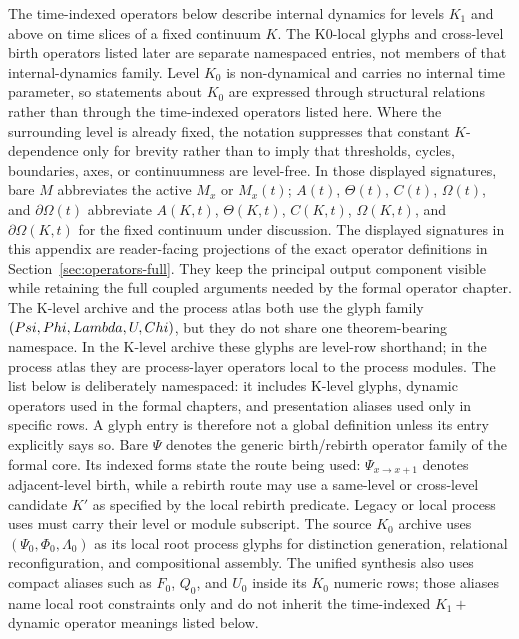 The time-indexed operators below describe internal dynamics for levels \(K_1\)
and above on time slices of a fixed continuum \(K\). The K0-local glyphs and
cross-level birth operators listed later are separate namespaced entries, not
members of that internal-dynamics family. Level \(K_0\) is non-dynamical and
carries no internal time parameter, so statements about \(K_0\) are expressed
through structural relations rather than through the time-indexed operators
listed here. Where the surrounding level is already fixed, the notation
suppresses that constant \(K\)-dependence only for brevity rather than to imply
that thresholds, cycles, boundaries, axes, or continuumness are level-free.
In those displayed signatures, bare \(M\) abbreviates the active \(M_x\) or
\(M_x(t)\); \(A(t)\), \(\Theta(t)\), \(C(t)\), \(\Omega(t)\), and
\(\partial\Omega(t)\) abbreviate \(A(K,t)\), \(\Theta(K,t)\), \(C(K,t)\),
\(\Omega(K,t)\), and \(\partial\Omega(K,t)\) for the fixed continuum under
discussion.
The displayed signatures in this appendix are reader-facing projections of
the exact operator definitions in Section~\ref{sec:operators-full}. They keep
the principal output component visible while retaining the full coupled
arguments needed by the formal operator chapter.
The K-level archive and the process atlas both use the glyph family
\((Psi,Phi,Lambda,U,Chi)\), but they do not share one theorem-bearing
namespace. In the K-level archive these glyphs are level-row shorthand; in the
process atlas they are process-layer operators local to the process modules.
The list below is deliberately namespaced: it includes K-level glyphs, dynamic
operators used in the formal chapters, and presentation aliases used only in
specific rows. A glyph entry is therefore not a global definition unless its
entry explicitly says so.
Bare \(\Psi\) denotes the generic birth/rebirth operator family of the formal
core. Its indexed forms state the route being used: \(\Psi_{x\to x+1}\)
denotes adjacent-level birth, while a rebirth route may use a same-level or
cross-level candidate \(K'\) as specified by the local rebirth predicate.
Legacy or local process uses must carry their level or module subscript.
The source \(K_0\) archive uses \((\Psi_0,\Phi_0,\Lambda_0)\) as its local
root process glyphs for distinction generation, relational reconfiguration,
and compositional assembly. The unified synthesis also uses compact aliases such
as \(F_0\), \(Q_0\), and \(U_0\) inside its \(K_0\) numeric rows; those aliases
name local root constraints only and do not inherit the time-indexed \(K_1+\)
dynamic operator meanings listed below.

